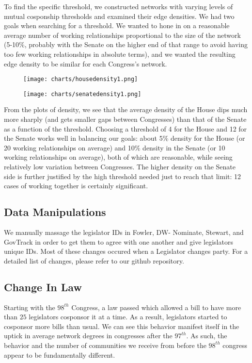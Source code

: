To find the specific threshold, we constructed networks with varying levels of
mutual cosponship thresholds and examined their edge densities. We had two goals
when searching for a threshold. We wanted to hone in on a reasonable average
number of working relationships proportional to the size of the network (5-10\%,
probably with the Senate on the higher end of that range to avoid having too few
working relationships in absolute terms), and we wanted the resulting edge
density to be similar for each Congress's network.

\begin{figure}[h!]
    \texttt{[image: charts/housedensity1.png]}
\end{figure}

\begin{figure}[h!]
    \texttt{[image: charts/senatedensity1.png]}
\end{figure}

From the plots of density, we see that the average density of the House dips
much more sharply (and gets smaller gaps between Congresses) than that of the
Senate as a function of the threshold. Choosing a threshold of 4 for the House
and 12 for the Senate works well in balancing our goals: about 5\% density for
the House (or 20 working relationships on average) and 10\% density in the
Senate (or 10 working relationships on average), both of which are reasonable,
while seeing relatively low variation between Congresses. The higher density on
the Senate side is further justified by the high threshold needed just to reach
that limit: 12 cases of working together is certainly significant.

\subsection{Data Manipulations}

We manually massage the legislator IDs in Fowler, DW- Nominate, Stewart, and
GovTrack in order to get them to agree with one another and give legislators
unique IDs. Most of these changes occured when a Legislator changes party. For a
detailed list of changes, please refer to our github repository.

\subsection{Change In Law}

Starting with the $98^{th}$ Congress, a law passed which allowed a bill to have
more than $25$ legislators cosponsor it at a time. As a result, legislators
started to cosponsor more bills than usual. We can see this behavior manifest
itself in the uptick in average network degrees in congresses after the
$97^{th}$. As such, the behavior and the number of communities we receive from
before the $98^{th}$ congress appear to be fundamentally different.
